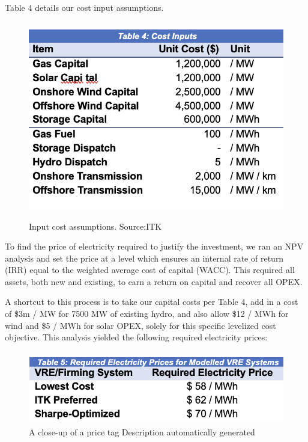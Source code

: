 \documentclass[
  letterpaper,
  DIV=11,
  numbers=noendperiod]{scrartcl}
\begin{document}
Table 4 details our cost input assumptions.

\begin{figure}[H]

{\centering \includegraphics[width=4.79167in,height=3.38889in]{./media/media/image18.png}

}

\caption{Input cost assumptions. Source:ITK}

\end{figure}%

To find the price of electricity required to justify the investment, we
ran an NPV analysis and set the price at a level which ensures an
internal rate of return (IRR) equal to the weighted average cost of
capital (WACC). This required all assets, both new and existing, to earn
a return on capital and recover all OPEX.

A shortcut to this process is to take our capital costs per Table 4, add
in a cost of \$3m / MW for 7500 MW of existing hydro, and also allow
\$12 / MWh for wind and \$5 / MWh for solar OPEX, solely for this
specific levelized cost objective. This analysis yielded the following
required electricity prices:

\begin{figure}[H]

{\centering \includegraphics[width=4.875in,height=1.25in]{./media/media/image19.png}

}

\caption{A close-up of a price tag Description automatically generated}

\end{figure}%
\end{document}
